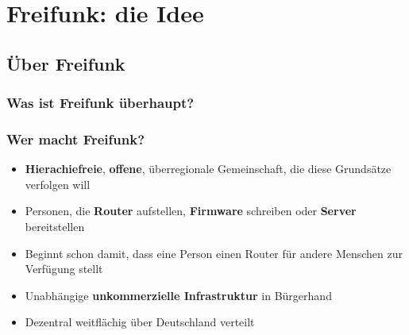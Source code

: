\section{Freifunk: die Idee}
\subsection{Über Freifunk}

\begin{frame}
\frametitle{Was ist Freifunk überhaupt?}
\end{frame}

\begin{frame}
\frametitle{Wer macht Freifunk?}
	\begin{itemize}
		\item \textbf{Hierachiefreie}, \textbf{offene}, überregionale Gemeinschaft, die diese Grundsätze verfolgen will
		\item Personen, die \textbf{Router} aufstellen, \textbf{Firmware} schreiben oder \textbf{Server} bereitstellen
		\item Beginnt schon damit, dass eine Person einen Router für andere Menschen zur Verfügung stellt
		\item Unabhängige \textbf{unkommerzielle Infrastruktur} in Bürgerhand
		\item Dezentral weitflächig über Deutschland verteilt
	\end{itemize}
\end{frame}

